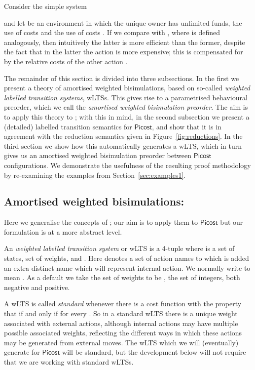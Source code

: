 \documentclass{LMCS}
\newcommand{\pfn}[1]{\mathsf{#1}}  \newcommand{\cfn}[1]{\mathsf{#1}}  \newcommand{\ownfnt}[1]{{\mathsf{#1}}}
\newcommand{\picost}{\ensuremath{\pfn{Picost}}\xspace}
\newcommand{\EndDefBox}{\null\hfill}
\newcommand{\boxHere}{\global\let\EndProof\empty\EndDefBox}
\begin{document}
\begin{exa}\label{ex:amort}
Consider the simple system 

and let  be an environment in which the unique owner
 has unlimited funds, the use of  costs  and the
use of  costs . If we compare  with
, where  is defined analogously,
then intuitively the latter is more efficient than the former, despite
the fact that in the latter the action  is more expensive; this
is compensated for by the relative costs of the other action .
\boxHere
\end{exa}

The remainder of this section is divided into three subsections. In the
first we present a theory of amortised weighted bisimulations, based on
so-called \emph{weighted labelled transition systems}, wLTSs.  This gives rise
to a parametrised behavioural preorder, which we call the
\emph{amortised weighted bisimulation preorder}.  The aim is to apply
this theory to ; with this in mind, in the second subsection
we present a (detailed) labelled transition semantics for \picost, and
show that it is in agreement with the reduction semantics given in
Figure~\ref{fig:reductions}. In the third section we show how this 
automatically generates a wLTS, which in turn gives us an
amortised weighted bisimulation preorder between \picost configurations. 
We demonstrate the usefulness of the resulting proof methodology
by re-examining the examples from Section~\ref{sec:examples1}.


\subsection{Amortised weighted bisimulations:}

Here we generalise  the concepts of \cite{astrid}; our aim is to apply them 
to \picost but our formulation is at a more abstract level.
\begin{defi}
An \emph{weighted labelled transition system} or wLTS is a 4-tuple 
 where  is a set of states,
 set of weights, and 
.
Here  denotes a set of action names   to which is added an
extra distinct name  which will represent internal action. 
We normally write  to mean 
. As a default we take the set of weights
to be , the set of integers, both negative and positive. \boxHere
\end{defi}
A wLTS is called \emph{standard} whenever there is a cost function
 with the property that  if
and only if  for every .  So in a standard
wLTS there is a unique weight associated with external actions,
although internal actions may have multiple possible associated
weights, reflecting the different ways in which these actions may be
generated from external moves. The wLTS which we will (eventually)
generate for \picost will be standard, but the development below will
not require that we are working with standard wLTSs.
\end{document}
